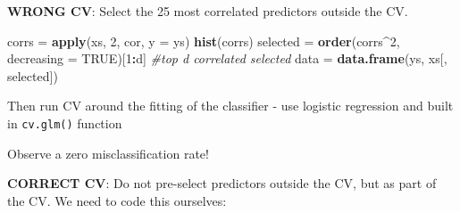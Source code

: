 \documentclass[]{article}
\newenvironment{Shaded}{\begin{snugshade}}{\end{snugshade}}
\newcommand{\KeywordTok}[1]{\textcolor[rgb]{0.13,0.29,0.53}{\textbf{#1}}}
\newcommand{\DataTypeTok}[1]{\textcolor[rgb]{0.13,0.29,0.53}{#1}}
\newcommand{\DecValTok}[1]{\textcolor[rgb]{0.00,0.00,0.81}{#1}}
\newcommand{\FloatTok}[1]{\textcolor[rgb]{0.00,0.00,0.81}{#1}}
\newcommand{\StringTok}[1]{\textcolor[rgb]{0.31,0.60,0.02}{#1}}
\newcommand{\CommentTok}[1]{\textcolor[rgb]{0.56,0.35,0.01}{\textit{#1}}}
\newcommand{\OtherTok}[1]{\textcolor[rgb]{0.56,0.35,0.01}{#1}}
\newcommand{\ControlFlowTok}[1]{\textcolor[rgb]{0.13,0.29,0.53}{\textbf{#1}}}
\newcommand{\OperatorTok}[1]{\textcolor[rgb]{0.81,0.36,0.00}{\textbf{#1}}}
\newcommand{\NormalTok}[1]{#1}
\begin{document}
\textbf{WRONG CV}: Select the 25 most correlated predictors outside the
CV.

\begin{Shaded}
\begin{Highlighting}[]
\NormalTok{corrs =}\StringTok{ }\KeywordTok{apply}\NormalTok{(xs, }\DecValTok{2}\NormalTok{, cor, }\DataTypeTok{y =}\NormalTok{ ys)}
\KeywordTok{hist}\NormalTok{(corrs)}
\NormalTok{selected =}\StringTok{ }\KeywordTok{order}\NormalTok{(corrs}\OperatorTok{^}\DecValTok{2}\NormalTok{, }\DataTypeTok{decreasing =} \OtherTok{TRUE}\NormalTok{)[}\DecValTok{1}\OperatorTok{:}\NormalTok{d]  }\CommentTok{#top d correlated selected}
\NormalTok{data =}\StringTok{ }\KeywordTok{data.frame}\NormalTok{(ys, xs[, selected])}
\end{Highlighting}
\end{Shaded}

Then run CV around the fitting of the classifier - use logistic
regression and built in \texttt{cv.glm()} function

\begin{Shaded}
\end{Shaded}

Observe a zero misclassification rate!

\textbf{CORRECT CV}: Do not pre-select predictors outside the CV, but as
part of the CV. We need to code this ourselves:
\end{document}
